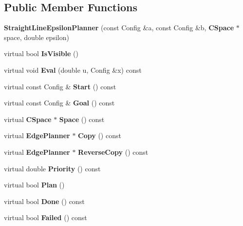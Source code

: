 \subsection*{Public Member Functions}
\begin{DoxyCompactItemize}
\item 
{\bfseries Straight\+Line\+Epsilon\+Planner} (const Config \&a, const Config \&b, {\bf C\+Space} $\ast$space, double epsilon)\label{classStraightLineEpsilonPlanner_ac641c0b7e08bba510366e6c9a5ad3cfb}

\item 
virtual bool {\bfseries Is\+Visible} ()\label{classStraightLineEpsilonPlanner_ae65de367b00380d4ac1b0b665bf3ec14}

\item 
virtual void {\bfseries Eval} (double u, Config \&x) const \label{classStraightLineEpsilonPlanner_acd8e8bbe6a515c94e63495f4c783ab20}

\item 
virtual const Config \& {\bfseries Start} () const \label{classStraightLineEpsilonPlanner_a35ad51c5701b7bbd22ec8cf0823fffa3}

\item 
virtual const Config \& {\bfseries Goal} () const \label{classStraightLineEpsilonPlanner_a36d9fd400faea7cc76924a97b61f2989}

\item 
virtual {\bf C\+Space} $\ast$ {\bfseries Space} () const \label{classStraightLineEpsilonPlanner_ad8151ca526cb6306df5cc4369820b81a}

\item 
virtual {\bf Edge\+Planner} $\ast$ {\bfseries Copy} () const \label{classStraightLineEpsilonPlanner_a297ae899e2a35268317bf3b49d74abde}

\item 
virtual {\bf Edge\+Planner} $\ast$ {\bfseries Reverse\+Copy} () const \label{classStraightLineEpsilonPlanner_ae1dd836c26ce2c8efdd37007563a37dd}

\item 
virtual double {\bfseries Priority} () const \label{classStraightLineEpsilonPlanner_afed110be4d704e15845a8f8b6534f320}

\item 
virtual bool {\bfseries Plan} ()\label{classStraightLineEpsilonPlanner_ac5ed85b1b379500fbf3e28e1cf10b0ed}

\item 
virtual bool {\bfseries Done} () const \label{classStraightLineEpsilonPlanner_a1edaa4b0182c5bd299bc298ea1fca986}

\item 
virtual bool {\bfseries Failed} () const \label{classStraightLineEpsilonPlanner_ac991b0a81c5fa084ded9291d03c8a4a4}

\end{DoxyCompactItemize}
